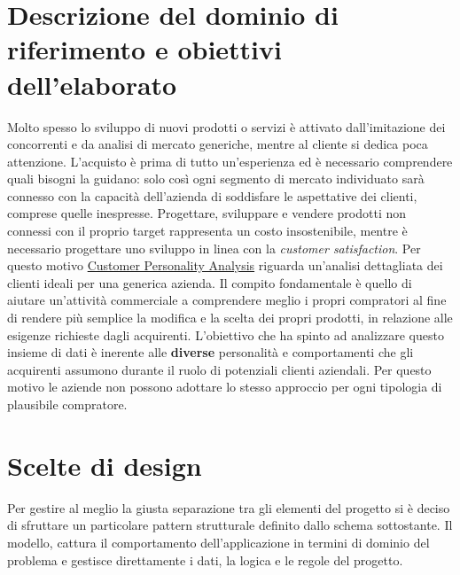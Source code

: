 \documentclass[letterpaper,11pt]{article}
\begin{document}
\section{Descrizione del dominio di riferimento e obiettivi dell’elaborato}
Molto spesso lo sviluppo di nuovi prodotti o servizi è attivato dall’imitazione dei concorrenti e da analisi di mercato generiche, mentre al cliente si dedica poca attenzione. L’acquisto è prima di tutto un’esperienza ed è necessario comprendere quali bisogni la guidano: solo così ogni segmento di mercato individuato sarà connesso con la capacità dell’azienda di soddisfare le aspettative dei clienti, comprese quelle inespresse. Progettare, sviluppare e vendere prodotti non connessi con il proprio target rappresenta un costo insostenibile, mentre è necessario progettare uno sviluppo in linea con la \textit{customer satisfaction}. Per questo motivo \href{https://github.com/MarioAvolio/Customer-Personality-Analysis-with-R}{Customer Personality Analysis} riguarda un'analisi dettagliata dei clienti ideali per una generica azienda. Il compito fondamentale è quello di aiutare un'attività commerciale a comprendere meglio i propri compratori al fine di rendere più semplice la modifica e la scelta dei propri prodotti, in relazione alle esigenze richieste dagli acquirenti. L'obiettivo che ha spinto ad analizzare questo insieme di dati è inerente alle \textbf{diverse} personalità e comportamenti che gli acquirenti assumono durante il ruolo di potenziali clienti aziendali. Per questo motivo le aziende non possono adottare lo stesso approccio per ogni tipologia di plausibile compratore. 

\section{Scelte di design}
Per gestire al meglio la giusta separazione tra gli elementi del progetto si è deciso di sfruttare un particolare pattern strutturale definito dallo schema sottostante. Il modello, cattura il comportamento dell'applicazione in termini di dominio del problema e gestisce direttamente i dati, la logica e le regole del progetto. 
\end{document}
